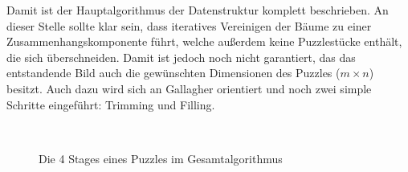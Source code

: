 \documentclass{whswinvcbook}
\begin{document}
Damit ist der Hauptalgorithmus der Datenstruktur komplett beschrieben. An dieser Stelle sollte klar sein, dass iteratives Vereinigen der Bäume zu einer Zusammenhangskomponente führt, welche außerdem keine Puzzlestücke enthält, die sich überschneiden. Damit ist jedoch noch nicht garantiert, das das entstandende Bild auch die gewünschten Dimensionen des Puzzles ($m\times n$) besitzt. Auch dazu wird sich an Gallagher \cite{gallagher,crisjim} orientiert und noch zwei simple Schritte eingeführt: Trimming und Filling.
\begin{figure}[H]
    \centering
    \quad\quad
    \\
    \quad\quad
    \caption{Die 4 Stages eines Puzzles im Gesamtalgorithmus}
    \label{fig-dsf-stages}
\end{figure}
\end{document}
